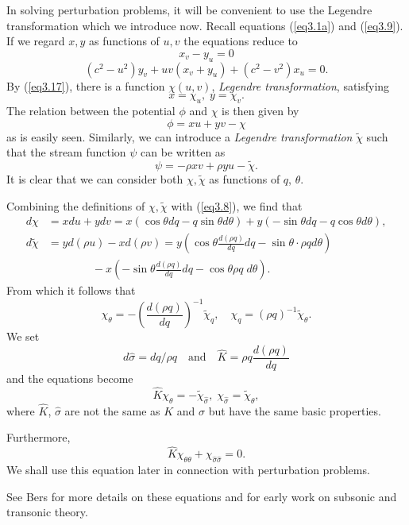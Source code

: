 \medskip
{} In solving perturbation problems, it will be convenient to use the Legendre transformation which we introduce now. Recall equations (\ref{eq3.1a}) and (\ref{eq3.9}). If we regard $x,y$ as functions of $u,v$ the equations reduce to 
\begin{equation*}
x_v - y_u = 0\tag{3.17}\label{eq3.17}
\end{equation*}
$$
(c^2 - u^2 ) y_v + uv (x_v + y_u) + (c^2 -v^2) x_u = 0.
$$
By (\ref{eq3.17}), there is a function $\chi(u,v)$, {\em Legendre transformation}, satisfying
$$
x = \chi_u, \; y = \chi_v. 
$$
The relation between the potential $\phi$ and $\chi$ is then given 
by 
$$
\phi = xu + yv -\chi
$$
as is easily seen. Similarly, we can introduce a {\em Legendre transformation } $\tilde{\chi}$ such that the stream function $\psi$ can be written as
$$
\psi = - \rho x v + \rho y u - \tilde{\chi}. 
$$\pageoriginale 
It is clear that we can consider both $\chi, \tilde{\chi}$ as functions of $q$, $\theta$.

Combining the definitions of $\chi, \tilde{\chi}$ with (\ref{eq3.8}), we find that 
\begin{align*}
 d \chi  & = x du + ydv = x (\cos \theta dq-q \sin \theta d\theta) + y (-\sin \theta dq - q \cos \theta d \theta),\\
d\tilde{\chi} & = yd (\rho u) - x d (\rho v) = y (\cos \theta \frac{d(\rho q)}{dq} dq - \sin \theta \cdot \rho q d \theta)\\
& \qquad \qquad -x (-\sin \theta \frac{d(\rho q)}{dq} dq - \cos \theta \rho q \; d\theta). 
\end{align*}
From which it follows that 
$$
\chi_\theta = - (\frac{d(\rho q)}{dq})^{-1} \tilde{\chi}_q, \quad \chi_q = (\rho q)^{-1} \tilde{\chi}_\theta. 
$$
We set
$$
d\hat{\sigma} = dq/\rho q \quad \text{and} \quad \hat{K} = \rho q \frac{d(\rho q)}{dq}
$$
and the equations become
$$
\hat{K} \chi_\theta = - \tilde{\chi}_{\hat{\sigma}}, \; \chi_{\hat{\sigma}} = \tilde{\chi}_\theta, 
$$
where $\hat{K}$, $\hat{\sigma}$ are not the same as $K$ and $\sigma$ but have the same basic properties.

Furthermore,
\begin{equation*}
\hat{K} \chi_{\theta \theta} + \chi_{\hat{\sigma} \hat{\sigma}} = 0. 
\tag{3.18}\label{eq3.18}
\end{equation*}
We shall use  this equation later in connection with perturbation problems.

See Bers \cite{key2} for more details on these equations and for early work on subsonic and transonic theory.


